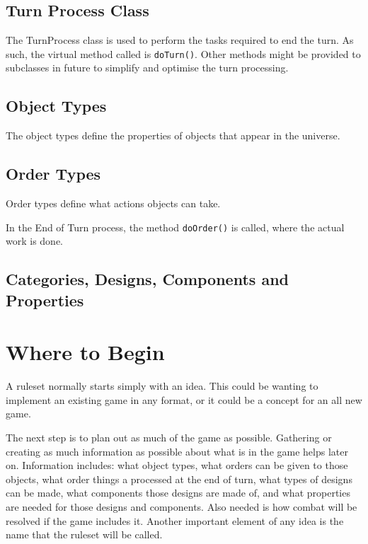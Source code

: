 \documentclass[a4paper,11pt]{report}
\begin{document}
\section{Turn Process Class}
\label{sec:turn-process}

The TurnProcess class is used to perform the tasks required to end the turn. As such, the virtual method called is \texttt{doTurn()}.  Other methods might be provided to subclasses in future to simplify and optimise the turn processing.

\section{Object Types}
\label{sec:object-types}

The object types define the properties of objects that appear in the universe.

\section{Order Types}
\label{sec:order-types}

Order types define what actions objects can take.

In the End of Turn process, the method \texttt{doOrder()} is called, where the actual work is done.

\section{Categories, Designs, Components and Properties}
\label{sec:designs-components-properties}

\chapter{Where to Begin}
\label{chap:begin}

A ruleset normally starts simply with an idea. This could be wanting to implement an existing game in any format, or it could be a concept for an all new game.

The next step is to plan out as much of the game as possible. Gathering or creating as much information as possible about what is in the game helps later on. Information includes: what object types, what orders can be given to those objects, what order things a processed at the end of turn, what types of designs can be made, what components those designs are made of, and what properties are needed for those designs and components.  Also needed is how combat will be resolved if the game includes it.
Another important element of any idea is the name that the ruleset will be called.
\end{document}
